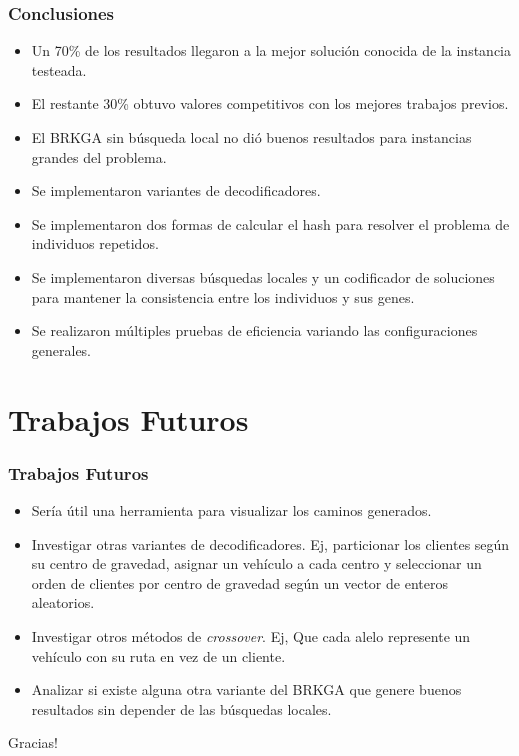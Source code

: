 \documentclass{beamer}
\begin{document}
\begin{frame}
\frametitle{Conclusiones}

\begin{itemize}
    \item Un 70\% de los resultados llegaron a la mejor solución conocida de la instancia testeada.
    \pause
    \item El restante 30\% obtuvo valores competitivos con los mejores trabajos previos.
    \pause
    \item El BRKGA sin búsqueda local no dió buenos resultados para instancias grandes del problema.
    \pause
    \item Se implementaron variantes de decodificadores.
    \pause
    \item Se implementaron dos formas de calcular el hash para resolver el problema de individuos repetidos.
    \pause
    \item Se implementaron diversas búsquedas locales y un codificador de soluciones para mantener la consistencia entre los individuos y sus genes.
    \pause
    \item Se realizaron múltiples pruebas de eficiencia variando las configuraciones generales.
\end{itemize}

\end{frame}


\section{Trabajos Futuros}

\begin{frame}
\frametitle{Trabajos Futuros}

\begin{itemize}
    \item Sería útil una herramienta para visualizar los caminos generados.
    \pause
    \item Investigar otras variantes de decodificadores. Ej, particionar los clientes según su centro de gravedad, asignar un vehículo a cada centro y seleccionar un orden de clientes por centro de gravedad según un vector de enteros aleatorios.
    \pause
    \item Investigar otros métodos de \textit{crossover}. Ej, Que cada alelo represente un vehículo con su ruta en vez de un cliente.
    \pause
    \item Analizar si existe alguna otra variante del BRKGA que genere buenos resultados sin depender de las búsquedas locales.
\end{itemize}

\end{frame}



\begin{frame}
\Huge{\centerline{Gracias!}}
\end{frame}

\end{document}
